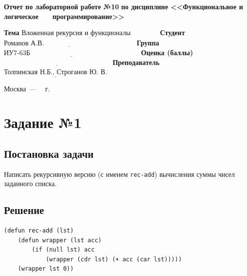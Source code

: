 \documentclass[12pt]{report}
\begin{document}
\begin{titlepage}
		\begin{center}
			\noindent\begin{minipage}{1.1\textwidth}\centering
				\Large\textbf{  Отчет по лабораторной работе №10}\newline
				\textbf{по дисциплине <<Функциональное и логическое}\newline
				\textbf{~~~программирование>>}\newline\newline
			\end{minipage}
		\end{center}
		
		\noindent\textbf{Тема} $\underline{\text{Вложенная рекурсия и функционалы~~~~~~~~~~~~}}$\newline\newline
		\noindent\textbf{Студент} $\underline{\text{Романов А.В.~~~~~~~~~~~~~~~~~~~~~~~~~~~~~~~~~~~~~~~~}}$\newline\newline
		\noindent\textbf{Группа} $\underline{\text{ИУ7-63Б~~~~~~~~~~~~~~~~~~~~~~~~~~~~~~~~~~~~~~~~~~~~~~~~}}$\newline\newline
		\noindent\textbf{Оценка (баллы)} $\underline{\text{~~~~~~~~~~~~~~~~~~~~~~~~~~~~~~~~~~~~~~~~~~~~~~~}}$\newline\newline
		\noindent\textbf{Преподаватель} $\underline{\text{Толпинская Н.Б., Строганов Ю. В.}}$\newline\newline\newline
		
		\begin{center}
			\vfill
			Москва~---~\the\year
			~г.
		\end{center}
	\end{titlepage}
	
	
\section*{Задание №1}
\subsection*{Постановка задачи}
Написать рекурсивную версию (с именем \texttt{rec-add}) вычисления суммы чисел заданного списка.

\subsection*{Решение}
\begin{lstlisting}
(defun rec-add (lst)
	(defun wrapper (lst acc)
		(if (null lst) acc
			(wrapper (cdr lst) (+ acc (car lst)))))
	(wrapper lst 0))
\end{lstlisting}
\end{document}
